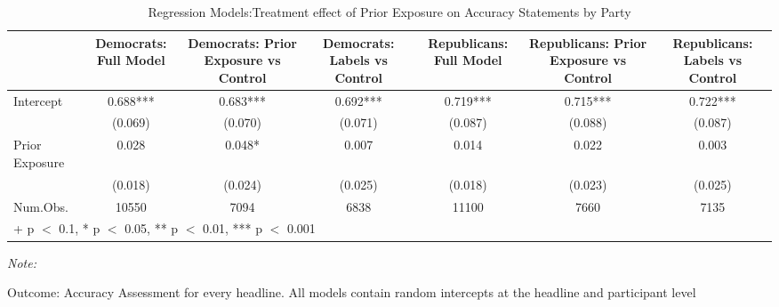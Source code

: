 \begin{table}

\caption{Regression Models:Treatment effect of Prior Exposure on Accuracy Statements by Party}
\centering
\begin{threeparttable}
\begin{tabular}[t]{lcccccc}
\toprule
  & Democrats: Full Model & Democrats: Prior Exposure vs Control & Democrats: Labels vs Control & Republicans: Full Model & Republicans: Prior Exposure vs Control & Republicans: Labels vs Control\\
\midrule
Intercept & 0.688*** & 0.683*** & 0.692*** & 0.719*** & 0.715*** & 0.722***\\
 & (0.069) & (0.070) & (0.071) & (0.087) & (0.088) & (0.087)\\
Prior Exposure & 0.028 & 0.048* & 0.007 & 0.014 & 0.022 & 0.003\\
 & (0.018) & (0.024) & (0.025) & (0.018) & (0.023) & (0.025)\\
\midrule
Num.Obs. & 10550 & 7094 & 6838 & 11100 & 7660 & 7135\\
\bottomrule
\multicolumn{7}{l}{\rule{0pt}{1em}+ p $<$ 0.1, * p $<$ 0.05, ** p $<$ 0.01, *** p $<$ 0.001}\\
\end{tabular}
\begin{tablenotes}
\item \textit{Note: } 
\item Outcome: Accuracy Assessment for every headline. All models contain random intercepts at the headline and participant level
\end{tablenotes}
\end{threeparttable}
\end{table}
